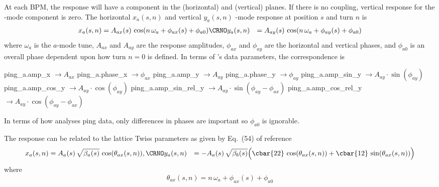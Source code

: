 \begin{description}
{{{{{{At each BPM, the response will have a component in the  (horizontal) and  (vertical)
planes. If there is no coupling, vertical response for the -mode component is zero. The
horizontal $x_a(s, n)$ and vertical $y_a(s, n)$ -mode response at position $s$ and turn $n$
is
\begin{align}
  x_a(s, n) &= A_{ax}(s) \, \cos(n \, \omega_a + \phi_{ax}(s) + \phi_{a0}) \CRNO
  y_a(s, n) &= A_{ay}(s) \, \cos(n \, \omega_a + \phi_{ay}(s) + \phi_{a0})
  \label{xanop1}
\end{align}
where $\omega_a$ is the $a$-mode tune, $A_{ax}$ and $A_{ay}$ are the response amplitudes, $\phi_{ax}$
and $\phi_{ay}$ are the horizontal and vertical phases, and $\phi_{a0}$ is an overall phase
dependent upon how turn $n = 0$ is defined. In terms of \tao's data parameters, the correspondence
is
\begin{example}
    ping_a.amp_x         \(\longrightarrow A_{ax}\)
    ping_a.phase_x       \(\longrightarrow \phi_{ax}\)
    ping_a.amp_y         \(\longrightarrow A_{ay}\)
    ping_a.phase_y       \(\longrightarrow \phi_{ay}\)
    ping_a.amp_sin_y     \(\longrightarrow A_{ay}\cdot\sin(\phi_{ay})\)
    ping_a.amp_cos_y     \(\longrightarrow A_{ay}\cdot\cos(\phi_{ay})\)
    ping_a.amp_sin_rel_y \(\longrightarrow A_{ay}\cdot\sin(\phi_{ay}-\phi_{ax})\)
    ping_a.amp_cos_rel_y \(\longrightarrow A_{ay}\cdot\cos(\phi_{ay}-\phi_{ax})\)
\end{example}
In terms of how \tao analyses ping data, only differences in phases are important so $\phi_{a0}$ is
ignorable. 

The response can be related to the lattice Twiss parameters as given by Eq.~(54) of reference
\cite{b:linear.coupled}
\begin{align}
  x_a(s, n) &=  A_a(s) \, \sqrt{\beta_a(s)} \, \cos(\theta_{ax}(s,n)) , \CRNO
  y_a(s, n) &= -A_a(s) \, \sqrt{\beta_b(s)} \Bigl( \cbar{22} \, \cos(\theta_{ax}(s,n)) +
     \cbar{12} \, \sin(\theta_{ax}(s,n)) \Bigr)
  \label{xabno}
\end{align}
where
\begin{equation}
  \theta_{ax}(s,n) = n \, \omega_a + \phi_{ax}(s) + \phi_{a0}
\end{equation}

}}}}}}
\end{description}
